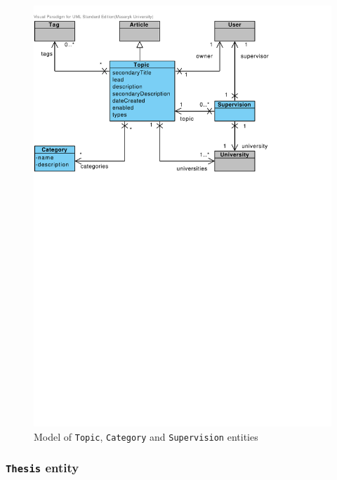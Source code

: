 \begin{figure}[h]
    \centering
        \includegraphics[trim=0 510 120 30, clip, keepaspectratio, width=\textwidth]{./images/domain-topic-category-supervision-entities.pdf}
    \caption{Model of \texttt{Topic}, \texttt{Category} and \texttt{Supervision} entities}
    \label{fig:domain-topic-category-supervision-entities}
\end{figure}

\subsubsection{\texttt{Thesis} entity}

\faketext[3]

